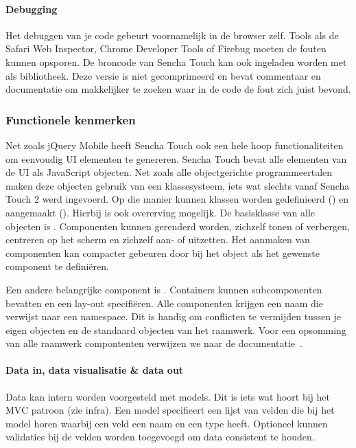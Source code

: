 \paragraph{Debugging}
Het debuggen van je code gebeurt voornamelijk in de browser zelf.  Tools als de Safari Web Inspector,  Chrome Developer Tools of Firebug moeten de fouten kunnen opsporen.  De broncode van Sencha Touch kan ook ingeladen worden met  als bibliotheek.  Deze versie is niet gecomprimeerd en bevat commentaar en documentatie om makkelijker te zoeken waar in de code de fout zich juist bevond.

\subsubsection{Functionele kenmerken}
Net zoals jQuery Mobile heeft Sencha Touch ook een hele hoop functionaliteiten om eenvoudig UI elementen te genereren.  Sencha Touch bevat alle elementen van de UI als JavaScript objecten.  Net zoals alle objectgerichte programmeertalen maken deze objecten gebruik van een klassesysteem,  iets wat slechts vanaf Sencha Touch 2 werd ingevoerd.  Op die manier kunnen klassen worden gedefinieerd () en aangemaakt ().  Hierbij is ook overerving mogelijk.  De basisklasse van alle objecten is .  Componenten kunnen gerenderd worden, zichzelf tonen of verbergen,  centreren op het scherm en zichzelf aan- of uitzetten.   Het aanmaken van componenten kan compacter gebeuren door bij het object als  het gewenste component te definiëren.  

Een andere belangrijke component is .  Containers kunnen subcomponenten bevatten en een lay-out specifiëren.  Alle componenten krijgen een naam die verwijst naar een namespace.  Dit is handig om conflicten te vermijden tussen je eigen objecten en de standaard objecten van het raamwerk.  Voor een opsomming van alle raamwerk compontenten verwijzen we naar de documentatie~\cite{Inc.2013a}.

\paragraph{Data in, data visualisatie \& data out}
Data kan intern worden voorgesteld met models.  Dit is iets wat hoort bij het MVC patroon (zie infra).  Een model specifieert een lijst van velden die bij het model horen waarbij een veld een naam en een type heeft.  Optioneel kunnen validaties bij de velden worden toegevoegd om data consistent te houden.  

